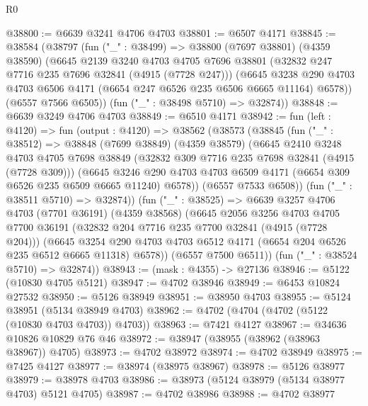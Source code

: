 \begin{lexlean}{R0}
\begin{coremodule}
@38800 := @6639 @3241 @4706 @4703
@38801 := @6507 @4171
@38845 := @38584
    (@38797
      (fun ("_" : @38499) =>
      @38800
        (@7697 @38801)
        (@4359 @38590)
        (@6645
          @2139
          @3240
          @4703
          @4705
          @7696
          @38801
          (@32832 @247 @7716 @235 @7696 @32841 (@4915 (@7728 @247)))
          (@6645
            @3238
            @290
            @4703
            @4703
            @6506
            @4171
            (@6654 @247 @6526 @235 @6506 @6665 @11164)
            @6578))
        (@6557 @7566 @6505))
      (fun ("_" : @38498 @5710) => @32874))
@38848 := @6639 @3249 @4706 @4703
@38849 := @6510 @4171
@38942 := fun (left : @4120) =>
  fun (output : @4120) =>
  @38562
    (@38573
      (@38845
        (fun ("_" : @38512) =>
        @38848
          (@7699 @38849)
          (@4359 @38579)
          (@6645
            @2410
            @3248
            @4703
            @4705
            @7698
            @38849
            (@32832 @309 @7716 @235 @7698 @32841 (@4915 (@7728 @309)))
            (@6645
              @3246
              @290
              @4703
              @4703
              @6509
              @4171
              (@6654 @309 @6526 @235 @6509 @6665 @11240)
              @6578))
          (@6557 @7533 @6508))
        (fun ("_" : @38511 @5710) => @32874))
      (fun ("_" : @38525) =>
      @6639
        @3257
        @4706
        @4703
        (@7701 @36191)
        (@4359 @38568)
        (@6645
          @2056
          @3256
          @4703
          @4705
          @7700
          @36191
          (@32832 @204 @7716 @235 @7700 @32841 (@4915 (@7728 @204)))
          (@6645
            @3254
            @290
            @4703
            @4703
            @6512
            @4171
            (@6654 @204 @6526 @235 @6512 @6665 @11318)
            @6578))
        (@6557 @7500 @6511))
      (fun ("_" : @38524 @5710) => @32874))
@38943 := (mask : @4355) -> @27136
@38946 := @5122 (@10830 @4705 @5121)
@38947 := @4702 @38946
@38949 := @6453 @10824 @27532
@38950 := @5126 @38949
@38951 := @38950 @4703
@38955 := @5124 @38951 (@5134 @38949 @4703)
@38962 := @4702 (@4704 (@4702 (@5122 (@10830 @4703 @4703)) @4703))
@38963 := @7421 @4127
@38967 := @34636 @10826 @10829 @76 @46
@38972 := @38947 (@38955 (@38962 (@38963 @38967)) @4705)
@38973 := @4702 @38972
@38974 := @4702 @38949
@38975 := @7425 @4127
@38977 := @38974 (@38975 @38967)
@38978 := @5126 @38977
@38979 := @38978 @4703
@38986 := @38973 (@5124 @38979 (@5134 @38977 @4703) @5121 @4705)
@38987 := @4702 @38986
@38988 := @4702 @38977

\end{coremodule}
\end{lexlean}
